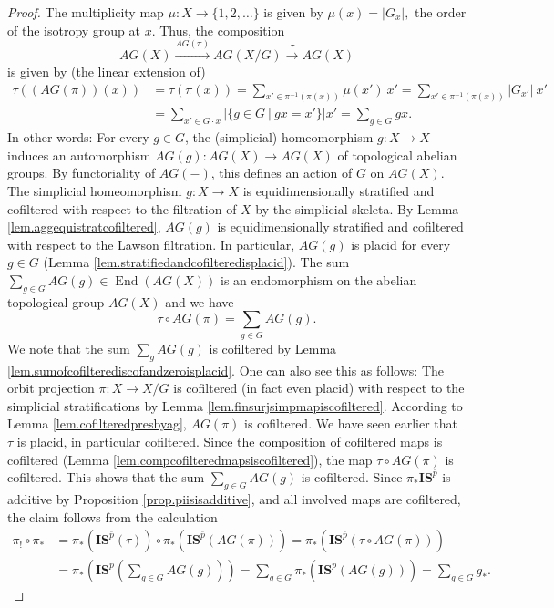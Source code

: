 \documentclass{amsart}
\theoremstyle{definition}
\theoremstyle{remark}
\newcommand {\End}   {\ensuremath{\operatorname{End}}}
\newcommand {\bp}    {{\ensuremath{\bar{p}}}}
\newcommand {\sIS}   {\mathbf{IS}}
\begin{document}
\begin{proof}
The multiplicity map $\mu: X \to \{ 1, 2,\ldots \}$ is given by
$\mu (x) = |G_x|,$ the order of the isotropy group at $x$.
Thus, the composition
\[ AG (X) \stackrel{AG(\pi)}{\longrightarrow} AG (X/G)  
  \stackrel{\tau}{\longrightarrow} AG (X)
\]
is given by (the linear extension of)
\begin{align*}
\tau ((AG(\pi)) (x))
&= \tau (\pi (x)) 
  = \sum_{x' \in \pi^{-1} (\pi (x))} \mu (x')~x' 
  = \sum_{x' \in \pi^{-1} (\pi (x))} |G_{x'}|~ x' \\
&= \sum_{x' \in G\cdot x} |\{ g\in G ~|~ gx=x' \}| x' 
  = \sum_{g\in G} gx.
\end{align*}
In other words:
For every $g\in G$, the (simplicial) homeomorphism $g: X\to X$ induces
an automorphism $AG(g): AG(X) \to AG(X)$ of topological abelian groups. 
By functoriality of $AG(-)$, this defines an action of $G$
on $AG(X)$. 
The simplicial homeomorphism $g:X \to X$ is equidimensionally stratified
and cofiltered with respect to the filtration of $X$ by the simplicial skeleta.
By Lemma \ref{lem.aggequistratcofiltered}, $AG(g)$ is
equidimensionally stratified and cofiltered with respect to the
Lawson filtration.
In particular, $AG(g)$ is placid for every $g\in G$ 
(Lemma \ref{lem.stratifiedandcofilteredisplacid}).
The sum
$\sum_{g\in G} AG(g) \in \End (AG(X))$ is an endomorphism on the abelian
topological group $AG(X)$ and we have
\[ \tau \circ AG(\pi) = \sum_{g\in G} AG(g). \] 
We note that the sum $\sum_g AG(g)$ is cofiltered by
Lemma \ref{lem.sumofcofilterediscofandzeroisplacid}.
One can also see this as follows:
The orbit projection $\pi: X \to X/G$ is
cofiltered (in fact even placid) with respect to the simplicial stratifications
by Lemma \ref{lem.finsurjsimpmapiscofiltered}.
According to Lemma \ref{lem.cofilteredpresbyag}, $AG (\pi)$ is cofiltered.
We have seen earlier that $\tau$ is placid, in particular cofiltered.
Since the composition of cofiltered maps is cofiltered
(Lemma \ref{lem.compcofilteredmapsiscofiltered}), the map
$\tau \circ AG(\pi)$ is cofiltered.
This shows that the sum $\sum_{g\in G} AG(g)$ is cofiltered.
Since $\pi_* \sIS^\bp$ is additive by
Proposition \ref{prop.piisisadditive}, and all involved maps are cofiltered,
the claim follows from the calculation
\begin{align*}
\pi_! \circ \pi_*
&= \pi_* (\sIS^\bp (\tau)) \circ \pi_* (\sIS^\bp (AG(\pi))) 
  = \pi_* (\sIS^\bp (\tau \circ AG(\pi))) \\
&= \pi_* (\sIS^\bp (\sum_{g\in G} AG(g))) 
  = \sum_{g\in G} \pi_* (\sIS^\bp (AG(g))) 
  = \sum_{g\in G} g_*.
\end{align*}


\end{proof}
\end{document}
